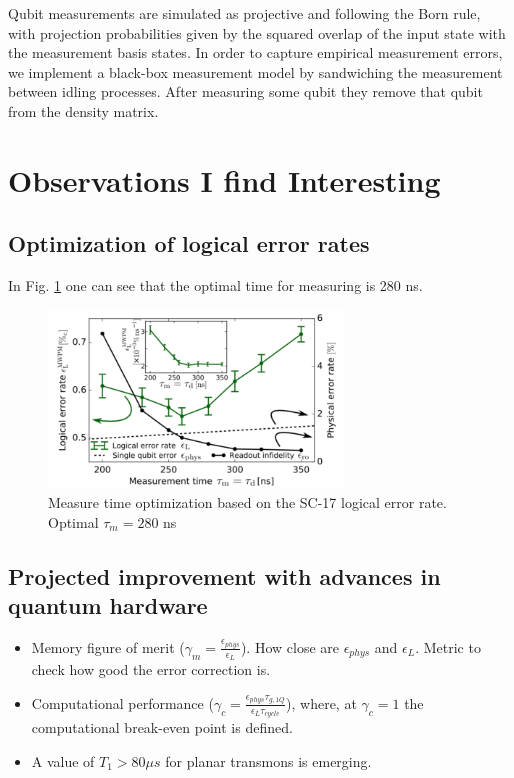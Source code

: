 \documentclass[11pt]{article}
\begin{document}
Qubit measurements are simulated as projective and following the Born rule, with projection probabilities given by the squared overlap of the input state with the measurement basis states. In order to capture empirical measurement errors, we implement a black-box measurement model by sandwiching the measurement between idling processes. After measuring some qubit they remove that qubit from the density matrix.


\section{Observations I find Interesting}
\label{sec:org1b1fbcd}
\subsection{Optimization of logical error rates}
\label{sec:org0e827da}

In Fig. \ref{fig:orgc4585d7} one can see that the optimal time for measuring is 280 ns.

\begin{figure}[htbp]
\centering
\includegraphics[width=0.7\textwidth]{measure_t_optimization.png}
\caption{\label{fig:orgc4585d7}
Measure time optimization based on the SC-17 logical error rate. Optimal \(\tau_m = 280\) ns}
\end{figure}


\subsection{Projected improvement with advances in quantum hardware}
\label{sec:org1a02258}

\begin{itemize}
\item Memory figure of merit (\(\gamma_m = \frac{\epsilon_{phys}}{\epsilon_{L}}\)). How close are \(\epsilon_{phys}\) and \(\epsilon_{L}\). Metric to check how good the error correction is.

\item Computational performance (\(\gamma_c = \frac{\epsilon_{phys} \tau_{g,1Q}}{\epsilon_L \tau_{cycle}}\)), where, at \(\gamma_c = 1\) the computational break-even point is defined.

\item A value of \(T_1 > 80 \mu s\) for planar transmons is emerging.
\end{itemize}
\end{document}
